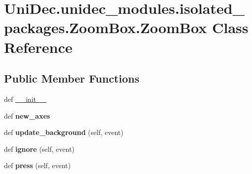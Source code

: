 \hypertarget{class_uni_dec_1_1unidec__modules_1_1isolated__packages_1_1_zoom_box_1_1_zoom_box}{}\section{Uni\+Dec.\+unidec\+\_\+modules.\+isolated\+\_\+packages.\+Zoom\+Box.\+Zoom\+Box Class Reference}
\label{class_uni_dec_1_1unidec__modules_1_1isolated__packages_1_1_zoom_box_1_1_zoom_box}
\subsection*{Public Member Functions}
\begin{DoxyCompactItemize}
\item 
def \hyperlink{class_uni_dec_1_1unidec__modules_1_1isolated__packages_1_1_zoom_box_1_1_zoom_box_a7537f4713e94995156ee0443ed328aa4}{\+\_\+\+\_\+init\+\_\+\+\_\+}
\item 
\hypertarget{class_uni_dec_1_1unidec__modules_1_1isolated__packages_1_1_zoom_box_1_1_zoom_box_a7a1f9d4bbb1803d140ba235b8c64a6e7}{}def {\bfseries new\+\_\+axes}\label{class_uni_dec_1_1unidec__modules_1_1isolated__packages_1_1_zoom_box_1_1_zoom_box_a7a1f9d4bbb1803d140ba235b8c64a6e7}

\item 
\hypertarget{class_uni_dec_1_1unidec__modules_1_1isolated__packages_1_1_zoom_box_1_1_zoom_box_aecba22db4b0aaf71c2275eb199e4a335}{}def {\bfseries update\+\_\+background} (self, event)\label{class_uni_dec_1_1unidec__modules_1_1isolated__packages_1_1_zoom_box_1_1_zoom_box_aecba22db4b0aaf71c2275eb199e4a335}

\item 
\hypertarget{class_uni_dec_1_1unidec__modules_1_1isolated__packages_1_1_zoom_box_1_1_zoom_box_aca518ee2d601c8c59885022b3c13f875}{}def {\bfseries ignore} (self, event)\label{class_uni_dec_1_1unidec__modules_1_1isolated__packages_1_1_zoom_box_1_1_zoom_box_aca518ee2d601c8c59885022b3c13f875}

\item 
\hypertarget{class_uni_dec_1_1unidec__modules_1_1isolated__packages_1_1_zoom_box_1_1_zoom_box_a9b9a4cb837c3f51cd9a402b7bb188214}{}def {\bfseries press} (self, event)\label{class_uni_dec_1_1unidec__modules_1_1isolated__packages_1_1_zoom_box_1_1_zoom_box_a9b9a4cb837c3f51cd9a402b7bb188214}


\end{DoxyCompactItemize}
